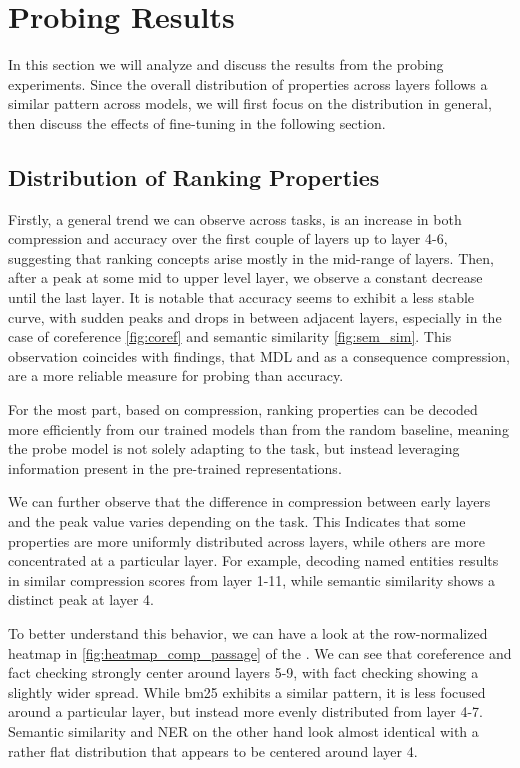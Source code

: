 \chapter{Probing Results}
\label{chap:results}
In this section we will analyze and discuss the results from the probing experiments. Since the overall distribution of properties across layers follows a similar pattern across models, we will first focus on the distribution in general, then discuss the effects of fine-tuning in the following section.

\section{Distribution of Ranking Properties}
Firstly, a general trend we can observe across tasks, is an increase in both compression and accuracy over the first couple of layers up to layer 4-6, suggesting that ranking concepts arise mostly in the mid-range of layers. Then, after a peak at some mid to upper level layer, we observe a constant decrease until the last layer. It is notable that accuracy seems to exhibit a less stable curve, with sudden peaks and drops in between adjacent layers, especially in the case of coreference \autoref{fig:coref} and semantic similarity \autoref{fig:sem_sim}. This observation coincides with \cite{voita-titov-2020-information} findings, that MDL and as a consequence compression, are a more reliable measure for probing than accuracy.

For the most part, based on compression, ranking properties can be decoded more efficiently from our trained models than from the random baseline, meaning the probe model is not solely adapting to the task, but instead leveraging information present in the pre-trained representations.

We can further observe that the difference in compression between early layers and the peak value varies depending on the task. This Indicates that some properties are more uniformly distributed across layers, while others are more concentrated at a particular layer. For example, decoding named entities results in similar compression scores from layer 1-11, while semantic similarity shows a distinct peak at layer 4.

To better understand this behavior, we can have a look at the row-normalized heatmap in \autoref{fig:heatmap_comp_passage} of the . We can see that coreference and fact checking strongly center around layers 5-9, with fact checking showing a slightly wider spread. While bm25 exhibits a similar pattern, it is less focused around a particular layer, but instead more evenly distributed from layer 4-7. Semantic similarity and NER on the other hand look almost identical with a rather flat distribution that appears to be centered around layer 4.

